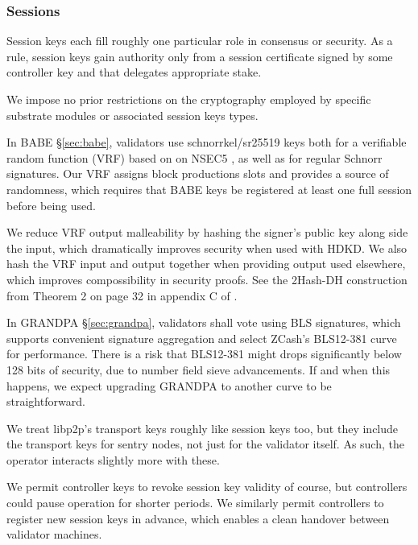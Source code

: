 \subsubsection{Sessions}

Session keys each fill roughly one particular role in consensus or security.  As a rule, session keys gain authority only from a session certificate signed by some controller key and that delegates appropriate stake.  

We impose no prior restrictions on the cryptography employed by specific substrate modules or associated session keys types.  

In BABE \S\ref{sec:babe}, validators use schnorrkel/sr25519 keys both for a verifiable random function (VRF) based on on NSEC5 \cite{NSEC5}, as well as for regular Schnorr signatures.  Our VRF assigns block productions slots and provides a source of randomness, which requires that BABE keys be registered at least one full session before being used.

We reduce VRF output malleability by hashing the signer's public key along side the input, which dramatically improves security when used with HDKD.  We also hash the VRF input and output together when providing output used elsewhere, which improves compossibility in security proofs. See the 2Hash-DH construction from Theorem 2 on page 32 in appendix C of \cite{Praos}.  

In GRANDPA \S\ref{sec:grandpa}, validators shall vote using BLS signatures, which supports convenient signature aggregation and select ZCash's BLS12-381 curve for performance.  There is a risk that BLS12-381 might drops significantly below 128 bits of security, due to number field sieve advancements.  If and when this happens, we expect upgrading GRANDPA to another curve to be straightforward. 


We treat libp2p's transport keys roughly like session keys too, but they include the transport keys for sentry nodes, not just for the validator itself.  As such, the operator interacts slightly more with these.

We permit controller keys to revoke session key validity of course, but controllers could pause operation for shorter periods.  We similarly permit controllers to register new session keys in advance, which enables a clean handover between validator machines.

